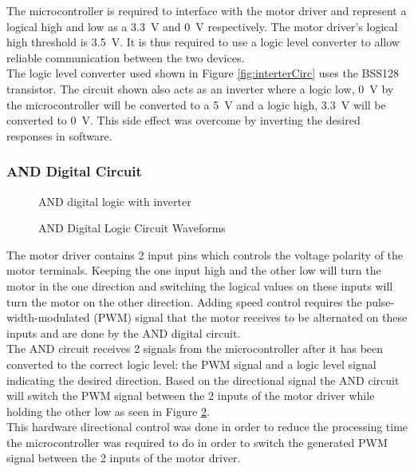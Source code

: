  
 The microcontroller is required to interface with the motor driver and represent a logical high and low as a \SI{3.3}{V} and \SI{0}{V} respectively. The motor driver's logical high threshold is \SI{3.5}{V}. It is thus required to use a logic level converter to allow reliable communication between the two devices.\\
 
 The logic level converter used shown in Figure \ref{fig:interterCirc} uses the BSS128 transistor. The circuit shown also acts as an inverter where a logic low, \SI{0}{V} by the microcontroller will be converted to a \SI{5}{V} and a logic high, \SI{3.3}{V} will be converted to \SI{0}{V}. This side effect was overcome by inverting the desired responses in software.
 
 
 \subsubsection{AND Digital Circuit}
 \begin{figure}[h]
 	\centering
 	
 	\caption{AND digital logic with inverter}
 	\label{fig:andCircuit}
 \end{figure}
 
 \begin{figure}[h]
 	\centering
 	
 	\caption{AND Digital Logic Circuit Waveforms}
 	\label{fig:andCircuit_waveform}
 \end{figure}
 
 The motor driver contains 2 input pins which controls the voltage polarity of the motor terminals. Keeping the one input high and the other low will turn the motor in the one direction and switching the logical values on these inputs will turn the motor on the other direction. Adding speed control requires the pulse-width-modulated (PWM) signal that the motor receives to be alternated on these inputs and are done by the AND digital circuit.\\
 
 The AND circuit receives 2 signals from the microcontroller  after it has been converted to the correct logic level: the PWM signal and a logic level signal indicating the desired direction. Based on the directional signal the AND circuit will switch the PWM signal between the 2 inputs of the motor driver while holding the other low as seen in Figure \ref{fig:andCircuit_waveform}.\\
 
 This hardware directional control was done in order to reduce the processing time the microcontroller was required to do in order to switch the generated PWM signal between the 2 inputs of the motor driver.

